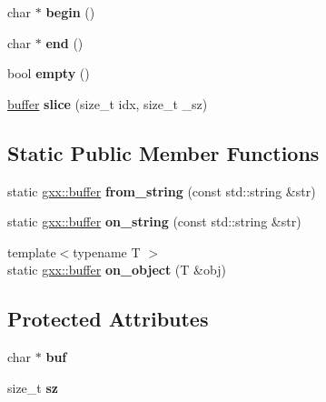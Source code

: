 \begin{DoxyCompactItemize}
\item 
char $\ast$ {\bfseries begin} ()\hypertarget{classgxx_1_1buffer_a2e2a945c167dc857f33b57ce676219ee}{}\label{classgxx_1_1buffer_a2e2a945c167dc857f33b57ce676219ee}

\item 
char $\ast$ {\bfseries end} ()\hypertarget{classgxx_1_1buffer_a5b4f116f5dacf672b98614a609fc6302}{}\label{classgxx_1_1buffer_a5b4f116f5dacf672b98614a609fc6302}

\item 
bool {\bfseries empty} ()\hypertarget{classgxx_1_1buffer_a9aaf7c7f29e6a870cde109ca7a02623f}{}\label{classgxx_1_1buffer_a9aaf7c7f29e6a870cde109ca7a02623f}

\item 
\hyperlink{classgxx_1_1buffer}{buffer} {\bfseries slice} (size\+\_\+t idx, size\+\_\+t \+\_\+sz)\hypertarget{classgxx_1_1buffer_aae963da3cb2afe7189638ae39fca540d}{}\label{classgxx_1_1buffer_aae963da3cb2afe7189638ae39fca540d}

\end{DoxyCompactItemize}
\subsection*{Static Public Member Functions}
\begin{DoxyCompactItemize}
\item 
static \hyperlink{classgxx_1_1buffer}{gxx\+::buffer} {\bfseries from\+\_\+string} (const std\+::string \&str)\hypertarget{classgxx_1_1buffer_ad66a56c6f559991a66b4fd88bad79f63}{}\label{classgxx_1_1buffer_ad66a56c6f559991a66b4fd88bad79f63}

\item 
static \hyperlink{classgxx_1_1buffer}{gxx\+::buffer} {\bfseries on\+\_\+string} (const std\+::string \&str)\hypertarget{classgxx_1_1buffer_a9606de5a1ece5a0d81d5c47a99cdf68d}{}\label{classgxx_1_1buffer_a9606de5a1ece5a0d81d5c47a99cdf68d}

\item 
{\footnotesize template$<$typename T $>$ }\\static \hyperlink{classgxx_1_1buffer}{gxx\+::buffer} {\bfseries on\+\_\+object} (T \&obj)\hypertarget{classgxx_1_1buffer_a96279b8e4c96eb322d7bb589fe6f7932}{}\label{classgxx_1_1buffer_a96279b8e4c96eb322d7bb589fe6f7932}

\end{DoxyCompactItemize}
\subsection*{Protected Attributes}
\begin{DoxyCompactItemize}
\item 
char $\ast$ {\bfseries buf}\hypertarget{classgxx_1_1buffer_a8fdf505343749bc0c21536b6fb00ece8}{}\label{classgxx_1_1buffer_a8fdf505343749bc0c21536b6fb00ece8}

\item 
size\+\_\+t {\bfseries sz}\hypertarget{classgxx_1_1buffer_a52bbe79e6c889e3444bb9c4c2b653f0d}{}\label{classgxx_1_1buffer_a52bbe79e6c889e3444bb9c4c2b653f0d}

\end{DoxyCompactItemize}


